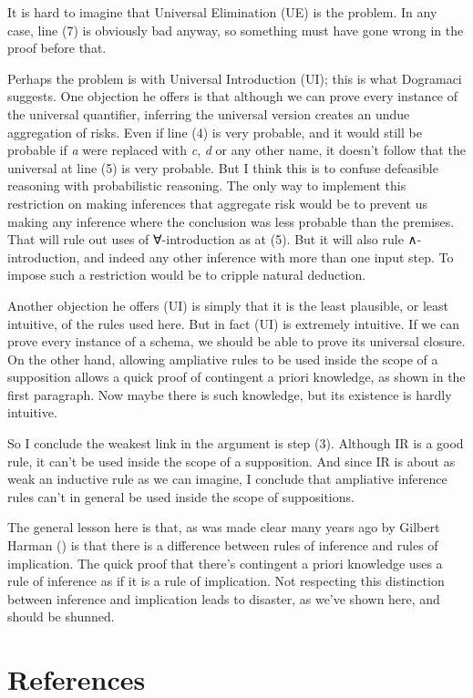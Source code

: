 \documentclass[
  10pt,
  letterpaper,
  DIV=11,
  numbers=noendperiod,
  twoside]{scrartcl}
\begin{document}
It is hard to imagine that Universal Elimination (UE) is the problem. In
any case, line (7) is obviously bad anyway, so something must have gone
wrong in the proof before that.

Perhaps the problem is with Universal Introduction (UI); this is what
Dogramaci suggests. One objection he offers is that although we can
prove every instance of the universal quantifier, inferring the
universal version creates an undue aggregation of risks. Even if line
(4) is very probable, and it would still be probable if \emph{a} were
replaced with \emph{c}, \emph{d} or any other name, it doesn't follow
that the universal at line (5) is very probable. But I think this is to
confuse defeasible reasoning with probabilistic reasoning. The only way
to implement this restriction on making inferences that aggregate risk
would be to prevent us making any inference where the conclusion was
less probable than the premises. That will rule out uses of
∀-introduction as at (5). But it will also rule ∧-introduction, and
indeed any other inference with more than one input step. To impose such
a restriction would be to cripple natural deduction.

Another objection he offers (UI) is simply that it is the least
plausible, or least intuitive, of the rules used here. But in fact (UI)
is extremely intuitive. If we can prove every instance of a schema, we
should be able to prove its universal closure. On the other hand,
allowing ampliative rules to be used inside the scope of a supposition
allows a quick proof of contingent a priori knowledge, as shown in the
first paragraph. Now maybe there is such knowledge, but its existence is
hardly intuitive.

So I conclude the weakest link in the argument is step (3). Although IR
is a good rule, it can't be used inside the scope of a supposition. And
since IR is about as weak an inductive rule as we can imagine, I
conclude that ampliative inference rules can't in general be used inside
the scope of suppositions.

The general lesson here is that, as was made clear many years ago by
Gilbert Harman () is that there is a
difference between rules of inference and rules of implication. The
quick proof that there's contingent a priori knowledge uses a rule of
inference as if it is a rule of implication. Not respecting this
distinction between inference and implication leads to disaster, as
we've shown here, and should be shunned.

\section*{References}\label{references}
\end{document}
